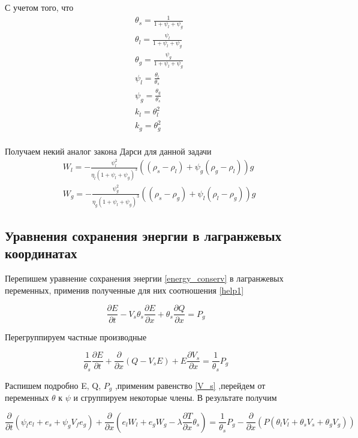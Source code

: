 \documentclass[12pt,a4paper]{article}
\newcommand{\pd}[2]{\frac{\partial #1}{\partial #2}}
\begin{document}
С учетом того, что
\begin{equation}
\begin{aligned}
&\theta_s = \frac1{1 + \psi_l + \psi_g}\\ 
&\theta_l = \frac{\psi_l}{1 + \psi_l + \psi_g}\\
&\theta_g = \frac{\psi_g}{1 + \psi_l + \psi_g}\\
&\psi_l = \frac{\theta_l}{\theta_s}\\
&\psi_g = \frac{\theta_g}{\theta_s}\\
&k_l = \theta_l^2\\
&k_g = \theta_g^2\\
\end{aligned}
\end{equation}

Получаем некий аналог закона Дарси для данной задачи
\begin{equation}
\begin{aligned}
&W_l = - \frac{\psi_l^2}{\eta_l(1 + \psi_l + \psi_g)^3}((\rho_s - \rho_l) + \psi_g(\rho_g - \rho_l))g\\	
&W_g = - \frac{\psi_g^2}{\eta_g(1 + \psi_l + \psi_g)^3}((\rho_s - \rho_g) + \psi_l(\rho_l - \rho_g))g
\end{aligned}
\label{Darsi_result}
\end{equation}

\subsection{Уравнения сохранения энергии в лагранжевых координатах}

Перепишем уравнение сохранения энергии \eqref{energy_conserv} в лагранжевых переменных, применив полученные для них соотношения \eqref{help1}

\begin{equation*}
\pd E t - V_s \theta_s \pd E x + \theta_s \pd Q x = P_g
\end{equation*}

Перегруппируем частные производные

\begin{equation*}
\frac 1 {\theta_s} \pd E t + \pd {}{x} \left(Q - V_s E\right) + E \pd{V_s}{x} = \frac 1 {\theta_s} P_g
\end{equation*}

Распишем подробно E, Q, $P_g$ ,применим равенство \eqref{V_s} ,перейдем от переменных $\theta$ к $\psi$ и сгруппируем некоторые члены. В результате получим

\begin{equation*}
\pd{} t \left(\psi_l e_l + e_s + \psi_g V_f e_g\right) + \pd{}{x}\left(e_l W_l + e_g W_g - \lambda \pd T x \theta_s\right) = \frac 1 {\theta_s} P_g - \pd{} x \left( P(\theta_l V_l + \theta_s V_s + \theta_g V_g)\right)
\end{equation*}
\end{document}
